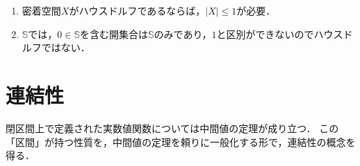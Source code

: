 \documentclass[uplatex,dvipdfmx]{jsreport}
\begin{document}
\begin{remark}\mbox{}
    \begin{enumerate}
        \item 密着空間$X$がハウスドルフであるならば，$|X|\le 1$が必要．
        \item $\mathbb{S}$では，$0\in\mathbb{S}$を含む開集合は$\mathbb{S}$のみであり，$1$と区別ができないのでハウスドルフではない．
    \end{enumerate}
\end{remark}

\section{連結性}

\begin{screen}
    閉区間上で定義された実数値関数については中間値の定理が成り立つ．
    この「区間」が持つ性質を，中間値の定理を頼りに一般化する形で，連結性の概念を得る．
\end{screen}
\end{document}
